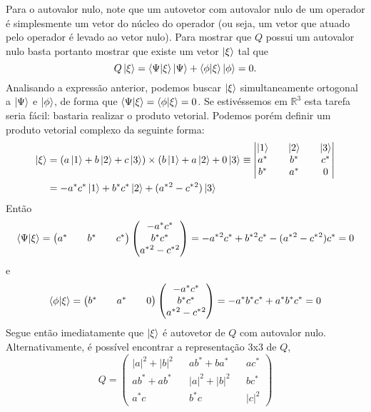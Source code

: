 \documentclass[a4paper, 12pt, notitlepage]{article}
\newcommand{\R}{\mathbb{R}}
\begin{document}
\begin{enumerate}
\begin{enumerate}[(A)]
  Para o autovalor nulo, note que um autovetor com autovalor nulo de um operador é simplesmente um vetor do núcleo do operador (ou seja, um vetor que atuado pelo operador é levado ao vetor nulo). Para mostrar que $Q$ possui um autovalor nulo basta portanto mostrar que existe um vetor $\ket{\xi}$ tal que
  \[
    Q\ket{\xi} = \bra{\Psi}\ket{\xi} \ket{\Psi} + \bra{\phi}\ket{\xi} \ket{\phi} = 0.
  \]
  Analisando a expressão anterior, podemos buscar $\ket{\xi}$ simultaneamente ortogonal a $\ket{\Psi}$ e $\ket{\phi}$, de forma que $\bra{\Psi}\ket{\xi} = \bra{\phi}\ket{\xi} = 0$. Se estivéssemos em $\R^3$ esta tarefa seria fácil: bastaria realizar o produto vetorial. Podemos porém definir um produto vetorial complexo da seguinte forma:
  \begin{align*}
    \ket{\xi} &= (a\ket{1} + b\ket{2} + c\ket{3}) \times (b\ket{1} + a\ket{2} + 0\ket{3} \equiv \begin{vmatrix}
    \ket{1} && \ket{2} && \ket{3} \\
    a^{\ast} && b^{\ast} && c^{\ast} \\
    b^{\ast} && a^{\ast} && 0
    \end{vmatrix} \\
    &= -a^\ast c^\ast \ket{1} + b^\ast c^\ast \ket{2} + (a^\ast{}^2 - c^{\ast}{}^2)\ket{3}
  \end{align*}
   Então
   \[
     \bra{\Psi}\ket{\xi} = 
     \begin{pmatrix}
     a^{\ast} && b^{\ast} && c^{\ast}
     \end{pmatrix}
     \begin{pmatrix}
     -a^\ast c^\ast \\ b^\ast c^\ast \\ a^\ast{}^2 - c^\ast{}^2
     \end{pmatrix} = -a^\ast{}^2 c^\ast + b^\ast{}^2 c^\ast - (a^\ast{}^2 - c^\ast{}^2)c^\ast = 0
   \]
   e
   \[
   \bra{\phi}\ket{\xi} =
   \begin{pmatrix}
   b^\ast && a^\ast && 0
   \end{pmatrix}
   \begin{pmatrix}
   -a^\ast c^\ast \\ b^\ast c^\ast \\ a^\ast{}^2 - c^\ast{}^2
   \end{pmatrix}
   = -a^\ast b^\ast c^\ast + a^\ast b^\ast c^\ast = 0
   \]
   Segue então imediatamente que $\ket{\xi}$ é autovetor de $Q$ com autovalor nulo.
   Alternativamente, é possível encontrar a representação 3x3 de $Q$,
   \begin{equation*}
   Q = \begin{pmatrix} 
   |a|^2 + |b|^2 && ab^\ast + ba^\ast && ac^\ast \\
   ab^\ast + ab^\ast && |a|^2 + |b|^2 && bc^\ast \\
   a^\ast c && b^\ast c && |c|^2   
   \end{pmatrix}
   \end{equation*}
   

\end{enumerate}
\end{enumerate}
\end{document}
